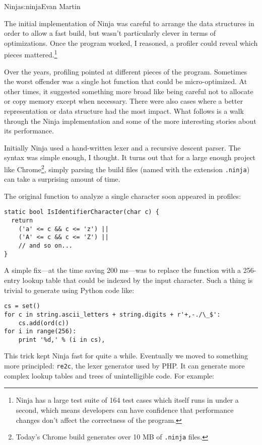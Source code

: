 \begin{aosachapter}{Ninja}{s:ninja}{Evan Martin}

The initial implementation of Ninja was careful to arrange the data
structures in order to allow a fast build, but wasn't particularly
clever in terms of optimizations. Once the program worked, I reasoned, a
profiler could reveal which pieces mattered.\footnote{Ninja has a large
  test suite of 164 test cases which itself runs in under a second,
  which means developers can have confidence that performance changes
  don't affect the correctness of the program.}

Over the years, profiling pointed at different pieces of the program.
Sometimes the worst offender was a single hot function that could be
micro-optimized. At other times, it suggested something more broad like
being careful not to allocate or copy memory except when necessary.
There were also cases where a better representation or data structure
had the most impact. What follows is a walk through the Ninja
implementation and some of the more interesting stories about its
performance.


Initially Ninja used a hand-written lexer and a recursive descent
parser. The syntax was simple enough, I thought. It turns out that for a
large enough project like Chrome\footnote{Today's Chrome build generates
  over 10 MB of \texttt{.ninja} files.}, simply parsing the build files
(named with the extension \texttt{.ninja}) can take a surprising amount
of time.

The original function to analyze a single character soon appeared in
profiles:

\begin{verbatim}
static bool IsIdentifierCharacter(char c) {
  return
    ('a' <= c && c <= 'z') ||
    ('A' <= c && c <= 'Z') ||
    // and so on...
}
\end{verbatim}

\noindent A simple fix---at the time saving 200 ms---was to replace the function
with a 256-entry lookup table that could be indexed by the input
character. Such a thing is trivial to generate using Python code like:

\begin{verbatim}
cs = set()
for c in string.ascii_letters + string.digits + r'+,-./\_$':
    cs.add(ord(c))
for i in range(256):
    print '%d,' % (i in cs),
\end{verbatim}

This trick kept Ninja fast for quite a while. Eventually we moved to
something more principled: \texttt{re2c}, the lexer generator used by
PHP. It can generate more complex lookup tables and trees of
unintelligible code. For example:


\end{aosachapter}
